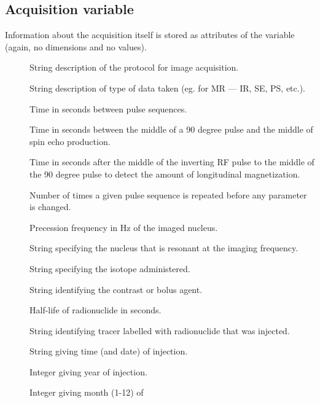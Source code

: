 \subsection{Acquisition variable}

Information about the acquisition itself is stored as attributes of
the  variable (again, no dimensions and no values).

\begin{description}
   \item [] String description of the protocol for
      image acquisition.
   \item [] String description of type of data
      taken (eg. for MR --- IR, SE, PS, etc.).
   \item [] Time in seconds between pulse
      sequences.
   \item [] Time in seconds between the middle of a 90
      degree pulse and the middle of spin echo production.
   \item [] Time in seconds after the middle of
      the inverting RF pulse to the middle of the 90 degree pulse to
      detect the amount of longitudinal magnetization.
   \item [] Number of times a given pulse sequence
      is repeated before any parameter is changed.
   \item [] Precession frequency in Hz of the
      imaged nucleus.
   \item [] String specifying the nucleus that is
      resonant at the imaging frequency.
   \item [] String specifying the isotope administered.
   \item [] String identifying the contrast or
      bolus agent.
   \item [] Half-life of radionuclide in
      seconds. 
   \item [] String identifying tracer labelled with
      radionuclide that was injected.
   \item [] String giving time (and date) of
      injection.
   \item []  Integer giving year of injection.
   \item [] Integer giving month (1-12) of

\end{description}
